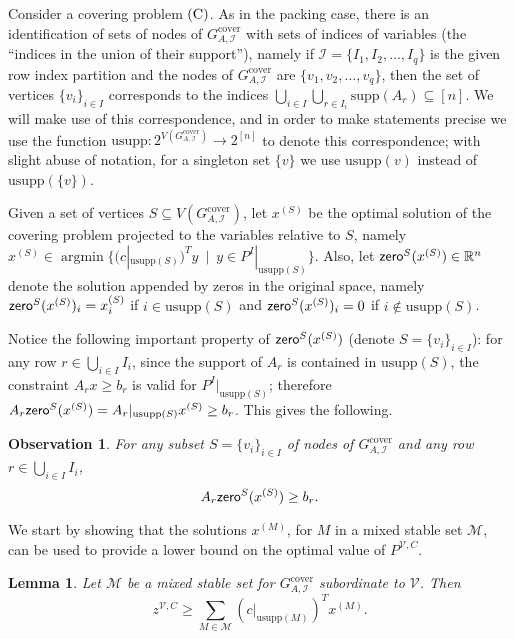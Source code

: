 \documentclass[smallextended]{svjour3}
\newtheorem{lemma}[proposition]{Lemma}
\newtheorem{observation}[proposition]{Observation}
\begin{document}
	Consider a covering problem $(\textup{C})$.	As in the packing case, there is an identification of sets of nodes of ${G^{\textrm{cover}}_{A, {\mathcal{I}}}}$ with sets of indices of variables (the ``indices in the union of their support''), namely if ${\mathcal{I}} = \{I_1, I_2, \ldots, I_q\}$ is the given row index partition and the nodes of ${G^{\textrm{cover}}_{A, {\mathcal{I}}}}$ are $\{v_1, v_2, \ldots, v_q\}$, then the set of vertices $\{v_i\}_{i \in I}$ corresponds to the indices $\bigcup_{i \in I} \bigcup_{r \in I_i} {\textrm{supp}}(A_r) \subseteq [n]$. We will make use of this correspondence, and in order to make statements precise we use the function ${\textrm{usupp}} : 2^{V({G^{\textrm{cover}}_{A, {\mathcal{I}}}})} \rightarrow 2^{[n]}$ to denote this correspondence; with slight abuse of notation, for a singleton set $\{v\}$ we use ${\textrm{usupp}}(v)$ instead of ${\textrm{usupp}}(\{v\})$.
	
	Given a set of vertices $S \subseteq V({G^{\textrm{cover}}_{A, {\mathcal{I}}}})$, let $x^{(S)}$ be the optimal solution of the covering problem projected to the variables relative to $S$, namely $x^{(S)} \in \operatorname{argmin}\{ (c|_{{\textrm{usupp}}(S)})^T y ~\mid~ y \in P^I|_{{\textrm{usupp}}(S)}\}$. Also, let ${{\sf zero}}^S(x^{(S)}) \in {\mathbb{R}}^n$ 
denote the solution appended by zeros in the original space, namely ${{\sf zero}}^S(x^{(S)})_i = x^{(S)}_i$ if $i \in {\textrm{usupp}}(S)$ and ${{\sf zero}}^S(x^{(S)})_i = 0$ if $i \notin {\textrm{usupp}}(S)$.
	
	Notice the following important property of ${{\sf zero}}^S(x^{(S)})$ (denote $S = \{v_i\}_{i \in I}$): for any row $r \in \bigcup_{i \in I} I_i$, since the support of $A_r$ is contained in ${\textrm{usupp}}(S)$, the constraint $A_r x \ge b_r$ is valid for $P^I|_{{\textrm{usupp}}(S)}$; therefore $A_r {{\sf zero}}^S(x^{(S)}) = A_r|_{{\textrm{usupp}}(S)} x^{(S)} \ge b_r$. This gives the following.

	\begin{observation} \label{obs:feasCov}
		For any subset $S = \{v_i\}_{i \in I}$ of nodes of ${G^{\textrm{cover}}_{A, {\mathcal{I}}}}$ and any row $r \in \bigcup_{i \in I} I_i$, $$A_r {{\sf zero}}^S(x^{(S)}) \ge b_r.$$
	\end{observation}

	We start by showing that the solutions $x^{(M)}$, for $M$ in a mixed stable set ${\mathcal{M}}$, can be used to provide a lower bound on the optimal value of $P^{{\mathcal{V}},C}$.

\begin{lemma}\label{lem:addstabletsetcover}
Let $\mathcal{M}$ be a mixed stable set for ${G^{\textrm{cover}}_{A, {\mathcal{I}}}}$ subordinate to ${\mathcal{V}}$. Then $$z^{{\mathcal{V}},C} \ge \sum_{M \in \mathcal{M}} (c|_{{\textrm{usupp}}(M)})^T x^{(M)}.$$ 
\end{lemma}
\end{document}
